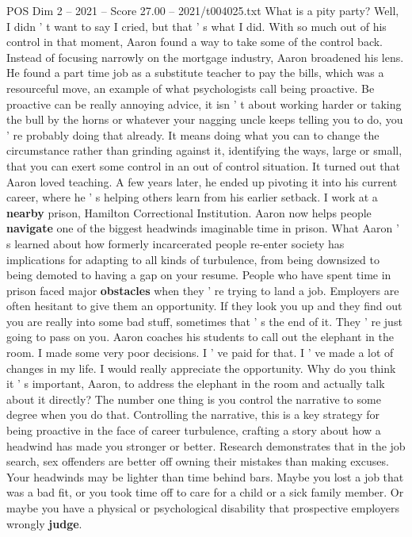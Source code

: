 \begin{textsample}{POS Dim 2 – 2021 – Score 27.00 – 2021/t004025.txt}
What is a pity party?
Well, I didn ' t want to say I cried, but that ' s what I did.
With so much out of his control in that moment, Aaron found a way to take some of the control back.
Instead of focusing narrowly on the mortgage industry, Aaron broadened his lens.
He found a part time job as a substitute teacher to pay the bills, which was a resourceful move, an example of what psychologists call being proactive.
Be proactive can be really annoying advice, it isn ' t about working harder or taking the bull by the horns or whatever your nagging uncle keeps telling you to do, you ' re probably doing that already.
It means doing what you can to change the circumstance rather than grinding against it, identifying the ways, large or small, that you can exert some control in an out of control situation.
It turned out that Aaron loved teaching.
A few years later, he ended up pivoting it into his current career, where he ' s helping others learn from his earlier setback.
I work at a \textbf{nearby} prison, Hamilton Correctional Institution.
Aaron now helps people \textbf{navigate} one of the biggest headwinds imaginable time in prison.
What Aaron ' s learned about how formerly incarcerated people re-enter society has implications for adapting to all kinds of turbulence, from being downsized to being demoted to having a gap on your resume.
People who have spent time in prison faced major \textbf{obstacles} when they ' re trying to land a job.
Employers are often hesitant to give them an opportunity.
If they look you up and they find out you are really into some bad stuff, sometimes that ' s the end of it.
They ' re just going to pass on you.
Aaron coaches his students to call out the elephant in the room.
I made some very poor decisions.
I ' ve paid for that.
I ' ve made a lot of changes in my life.
I would really appreciate the opportunity.
Why do you think it ' s important, Aaron, to address the elephant in the room and actually talk about it directly?
The number one thing is you control the narrative to some degree when you do that.
Controlling the narrative, this is a key strategy for being proactive in the face of career turbulence, crafting a story about how a headwind has made you stronger or better.
Research demonstrates that in the job search, sex offenders are better off owning their mistakes than making excuses.
Your headwinds may be lighter than time behind bars.
Maybe you lost a job that was a bad fit, or you took time off to care for a child or a sick family member.
Or maybe you have a physical or psychological disability that prospective employers wrongly \textbf{judge}.

\end{textsample}

